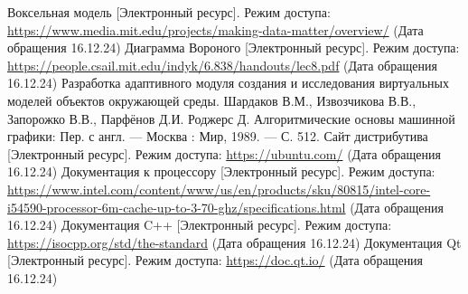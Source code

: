 \begin{thebibliography}{}
	 Воксельная модель [Электронный ресурс]. Режим доступа: \url{https://www.media.mit.edu/projects/making-data-matter/overview/} (Дата обращения 16.12.24)
	 Диаграмма Вороного [Электронный ресурс]. Режим доступа: \url{https://people.csail.mit.edu/indyk/6.838/handouts/lec8.pdf} (Дата обращения 16.12.24)
	 Разработка адаптивного модуля создания и исследования виртуальных моделей объектов окружающей среды. Шардаков В.М., Извозчикова В.В., Запорожко В.В., Парфёнов Д.И.
	 Роджерс Д. Алгоритмические основы машинной графики: Пер. с англ. —
	Москва : Мир, 1989. — С. 512.
	 Сайт дистрибутива [Электронный ресурс]. Режим доступа: \url{https://ubuntu.com/} (Дата обращения 16.12.24)
	 Документация к процессору [Электронный ресурс]. Режим доступа: \url{https://www.intel.com/content/www/us/en/products/sku/80815/intel-core-i54590-processor-6m-cache-up-to-3-70-ghz/specifications.html} (Дата обращения 16.12.24)
	 Документация C++ [Электронный ресурс]. Режим доступа: \url{https://isocpp.org/std/the-standard} (Дата обращения 16.12.24)
	 Документация Qt [Электронный ресурс]. Режим доступа: \url{https://doc.qt.io/} (Дата обращения 16.12.24)
	
\end{thebibliography}